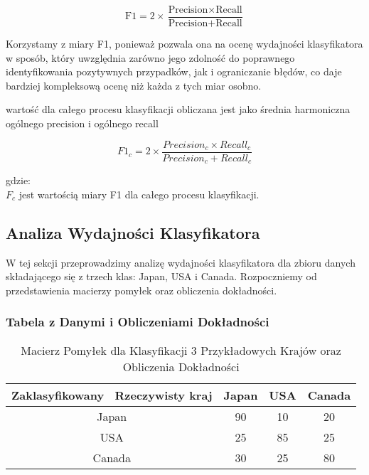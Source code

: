\documentclass{article}
\begin{document}
\begin{equation}
    \text{F1} = 2 \times \frac{\text{Precision} \times \text{Recall}}{\text{Precision} + \text{Recall}}
\end{equation}


\noindent Korzystamy z miary F1, ponieważ pozwala ona na ocenę wydajności klasyfikatora w sposób, który uwzględnia zarówno jego zdolność do poprawnego identyfikowania pozytywnych przypadków, jak i ograniczanie błędów, co daje bardziej kompleksową ocenę niż każda z tych miar osobno. \newline

\noindent wartość dla całego procesu klasyfikacji obliczana jest jako średnia harmoniczna ogólnego precision i ogólnego recall

\begin{equation}
    F1_c = 2 \times \frac{Precision_c \times Recall_c}{Precision_c + Recall_c}
\end{equation}

\noindent gdzie: \\
$F_c$ jest wartością miary F1 dla całego procesu klasyfikacji.


\subsection*{Analiza Wydajności Klasyfikatora}

W tej sekcji przeprowadzimy analizę wydajności klasyfikatora dla zbioru danych składającego się z trzech klas: Japan, USA i Canada. Rozpoczniemy od przedstawienia macierzy pomyłek oraz obliczenia dokładności.


\subsubsection*{Tabela z Danymi i Obliczeniami Dokładności}

\begin{table}[htbp]
\centering
\caption{Macierz Pomyłek dla Klasyfikacji 3 Przykładowych Krajów oraz Obliczenia Dokładności \newline} 
\label{tab:data_accuracy}
\begin{tabular}{|c|c|c|c|}
\hline
Zaklasyfikowany \ Rzeczywisty kraj & Japan & USA & Canada \\ \hline
Japan                              & 90    & 10  & 20     \\ \hline
USA                                & 25    & 85  & 25     \\ \hline
Canada                             & 30    & 25  & 80     \\ \hline
\end{tabular}
\end{table}
\end{document}
